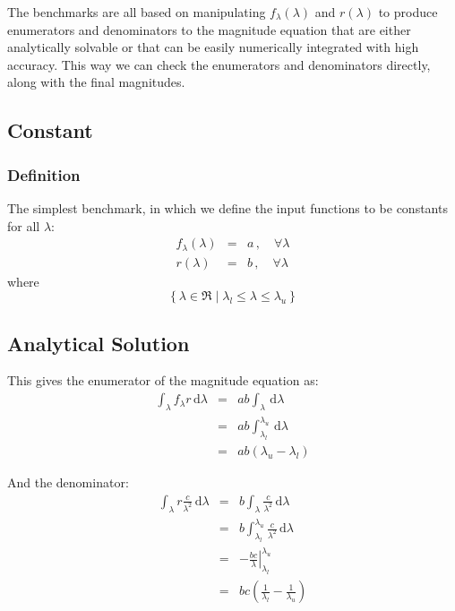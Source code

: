 \documentclass[12pt]{scrartcl}
\newcommand{\dx}[1]{\ensuremath{\,\mathrm{d}#1}}
\begin{document}
The benchmarks are all based on manipulating $f_\lambda(\lambda)$ and
$r(\lambda)$ to produce enumerators and denominators to the magnitude
equation that are either analytically solvable or that can be easily
numerically integrated with high accuracy. This way we can check the
enumerators and denominators directly, along with the final magnitudes.

\subsection{Constant}

\subsubsection{Definition}

The simplest benchmark, in which we define the input functions to be
constants for all $\lambda$:
\begin{eqnarray*}
f_\lambda(\lambda) & = & a \, , \quad \forall \lambda \\
r(\lambda) & = & b \, , \quad \forall \lambda
\end{eqnarray*}
where
\[ \left\{ \lambda \in \Re \mid \lambda_l \leq \lambda \le \lambda_u \right\} \]

\subsection{Analytical Solution}

This gives the enumerator of the magnitude equation as:
\begin{eqnarray*}
\int_\lambda f_\lambda r \dx{\lambda} & = & ab \int_\lambda \dx{\lambda}
\\
& = & ab \int_{\lambda_l}^{\lambda_u} \dx{\lambda} \\
& = & ab\left( \lambda_u - \lambda_l \right)
\end{eqnarray*}

And the denominator:
\begin{eqnarray*}
\int_\lambda r \frac{c}{\lambda^2} \dx{\lambda} & = & b \int_\lambda
\frac{c}{\lambda^2} \dx{\lambda} \\
&= & b \int_{\lambda_l}^{\lambda_u} \frac{c}{\lambda^2} \dx{\lambda} \\
&= & \left. -\frac{bc}{\lambda} \right|_{\lambda_l}^{\lambda_u} \\
& = & bc\left( \frac{1}{\lambda_l} - \frac{1}{\lambda_u} \right)
\end{eqnarray*}
\end{document}
